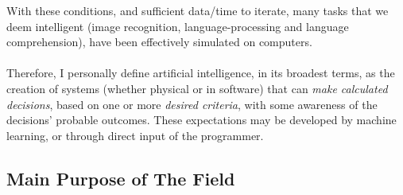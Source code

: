 \documentclass[10pt,a4paper]{article}
\begin{document}
				With these conditions, and sufficient data/time to iterate, many tasks
				that we deem intelligent (image recognition, language-processing and
				language comprehension), have been effectively simulated on computers. \\\\
				Therefore, I personally define artificial intelligence, in its broadest
				terms, as the creation of systems (whether physical or in software) that
				can \textsl{make calculated decisions}, based on one or more
				\textsl{desired criteria}, with some awareness of the decisions'
				probable outcomes. These expectations may be developed by machine
				learning, or through direct input of the programmer.

			\subsection{Main Purpose of The Field}
\end{document}
